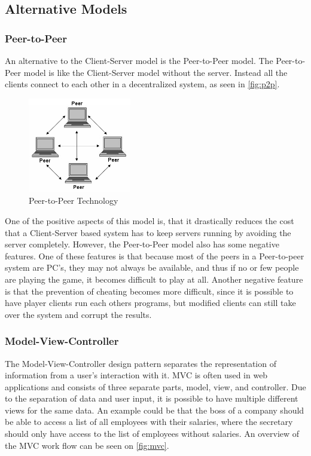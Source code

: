 \subsection{Alternative Models}
\subsubsection{Peer-to-Peer}
An alternative to the Client-Server model is the Peer-to-Peer model.
The Peer-to-Peer model is like the Client-Server model without the server.
Instead all the clients connect to each other in a decentralized system, as seen in \autoref{fig:p2p}.

\begin{figure}[ht]
  \centering
    \includegraphics[width=0.4\textwidth]{img/p2p.jpg}
  \caption{Peer-to-Peer Technology \citep{PeerToPeer}}
  \label{fig:p2p}
\end{figure}

One of the positive aspects of this model is, that it drastically reduces the cost that a Client-Server based system has to keep servers running by avoiding the server completely.
However, the Peer-to-Peer model also has some negative features.
One of these features is that because most of the peers in a Peer-to-peer system are PC's, they may not always be available, and thus if no or few people are playing the game, it becomes difficult to play at all.
Another negative feature is that the prevention of cheating becomes more difficult, since it is possible to have player clients run each others programs, but modified clients can still take over the system and corrupt the results.\newline

\subsubsection{Model-View-Controller}
The Model-View-Controller design pattern separates the representation of information from a user's interaction with it.
MVC is often used in web applications and consists of three separate parts, model, view, and controller.
Due to the separation of data and user input, it is possible to have multiple different views for the same data.
An example could be that the boss of a company should be able to access a list of all employees with their salaries, where the secretary should only have access to the list of employees without salaries.
An overview of the MVC work flow can be seen on \autoref{fig:mvc}.\newline

